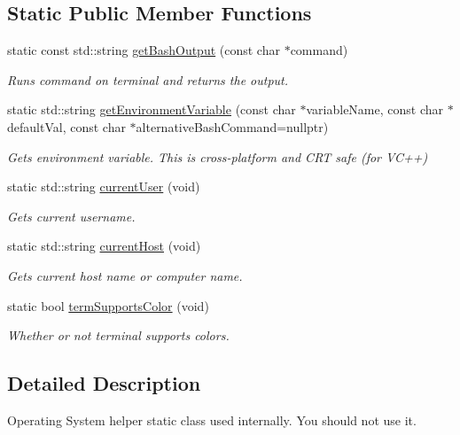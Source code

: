 \subsection*{Static Public Member Functions}
\begin{DoxyCompactItemize}
\item 
static const std\+::string \hyperlink{classel_1_1base_1_1utils_1_1_o_s_a91304c76c872459eaa9fdb3466367cd3}{get\+Bash\+Output} (const char $\ast$command)
\begin{DoxyCompactList}\small\item\em Runs command on terminal and returns the output. \end{DoxyCompactList}\item 
static std\+::string \hyperlink{classel_1_1base_1_1utils_1_1_o_s_a91540f3d8c87bd121e55fc39270eac3c}{get\+Environment\+Variable} (const char $\ast$variable\+Name, const char $\ast$default\+Val, const char $\ast$alternative\+Bash\+Command=nullptr)
\begin{DoxyCompactList}\small\item\em Gets environment variable. This is cross-\/platform and C\+R\+T safe (for V\+C++) \end{DoxyCompactList}\item 
static std\+::string \hyperlink{classel_1_1base_1_1utils_1_1_o_s_ac7839ecd50e379dbdfcfce130906386e}{current\+User} (void)
\begin{DoxyCompactList}\small\item\em Gets current username. \end{DoxyCompactList}\item 
static std\+::string \hyperlink{classel_1_1base_1_1utils_1_1_o_s_aae4fdf83828228fc440f8a875c5942b0}{current\+Host} (void)
\begin{DoxyCompactList}\small\item\em Gets current host name or computer name. \end{DoxyCompactList}\item 
static bool \hyperlink{classel_1_1base_1_1utils_1_1_o_s_a2c941329a14ce0ea920f57779857864c}{term\+Supports\+Color} (void)
\begin{DoxyCompactList}\small\item\em Whether or not terminal supports colors. \end{DoxyCompactList}\end{DoxyCompactItemize}


\subsection{Detailed Description}
Operating System helper static class used internally. You should not use it. 

